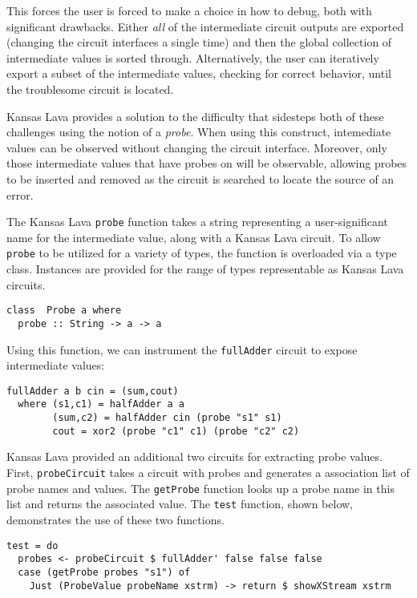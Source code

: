 \documentclass{llncs}
\begin{document}
This forces the user is forced to make a choice in how to debug, both with
significant drawbacks. Either \emph{all} of the intermediate circuit outputs are
exported (changing the circuit interfaces a single time) and then the global
collection of intermediate values is sorted through. Alternatively, the user can
iteratively export a subset of the intermediate values, checking for correct
behavior, until the troublesome circuit is located.

Kansas Lava provides a solution to the difficulty that sidesteps both of these
challenges using the notion of a \emph{probe}. When using this construct,
intemediate values can be observed without changing the circuit
interface. Moreover, only those intermediate values that have probes on will be
observable, allowing probes to be inserted and removed as the circuit is
searched to locate the source of an error.

The Kansas Lava \verb!probe! function takes a string representing a
user-significant name for the intermediate value, along with a Kansas Lava
circuit. To allow \verb!probe! to be utilized for a variety of types, the
function is overloaded via a type class. Instances are provided for the range of
types representable as Kansas Lava circuits.

\begin{verbatim}
class  Probe a where
  probe :: String -> a -> a
\end{verbatim}

Using this function, we can instrument the \verb!fullAdder! circuit to expose
intermediate values:

\begin{verbatim}
fullAdder a b cin = (sum,cout)
  where (s1,c1) = halfAdder a a
        (sum,c2) = halfAdder cin (probe "s1" s1)
        cout = xor2 (probe "c1" c1) (probe "c2" c2)
\end{verbatim}

Kansas Lava provided an additional two circuits for extracting probe
values. First, \verb!probeCircuit! takes a circuit with probes and generates a
association list of probe names and values. The \verb!getProbe! function looks
up a probe name in this list and returns the associated value. The \verb!test!
function, shown below, demonstrates the use of these two functions.

\begin{verbatim}
test = do
  probes <- probeCircuit $ fullAdder' false false false
  case (getProbe probes "s1") of
    Just (ProbeValue probeName xstrm) -> return $ showXStream xstrm
\end{verbatim}
\end{document}
